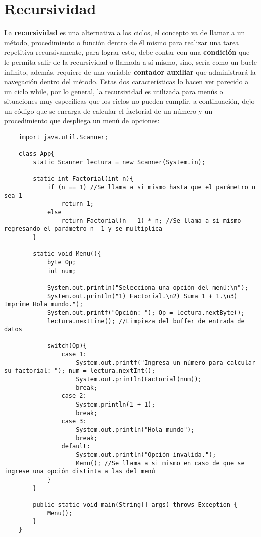 \section{Recursividad}
La \textbf{recursividad} es una alternativa a los ciclos, el concepto va de llamar a un método, procedimiento o función dentro de él mismo para realizar una tarea repetitiva recursivamente, para lograr esto, debe contar con una \textbf{condición} que le permita salir de la recursividad o llamada a sí mismo, sino, sería como un bucle infinito, además, requiere de una variable \textbf{contador auxiliar} que administrará la navegación dentro del método.
Estas dos características lo hacen ver parecido a un ciclo while, por lo general, la recursividad es utilizada para menús o situaciones muy específicas que los ciclos no pueden cumplir, a continuación, dejo un código que se encarga de calcular el factorial de un número y un procedimiento que despliega un menú de opciones:
\begin{lstlisting}
	import java.util.Scanner;

	class App{
		static Scanner lectura = new Scanner(System.in);	
	
		static int Factorial(int n){
			if (n == 1) //Se llama a si mismo hasta que el parámetro n sea 1
				return 1;
			else
				return Factorial(n - 1) * n; //Se llama a si mismo regresando el parámetro n -1 y se multiplica
		}
		
		static void Menu(){
			byte Op;
			int num;
			
			System.out.println("Selecciona una opción del menú:\n");
			System.out.println("1) Factorial.\n2) Suma 1 + 1.\n3) Imprime Hola mundo.");
			System.out.printf("Opción: "); Op = lectura.nextByte();
			lectura.nextLine(); //Limpieza del buffer de entrada de datos
			
			switch(Op){
				case 1:
					System.out.printf("Ingresa un número para calcular su factorial: "); num = lectura.nextInt();
					System.out.println(Factorial(num));
					break;
				case 2:
					System.println(1 + 1);
					break;
				case 3:
					System.out.println("Hola mundo");
					break;
				default:
					System.out.println("Opción invalida.");
					Menu(); //Se llama a si mismo en caso de que se ingrese una opción distinta a las del menú
			}
		}
	
		public static void main(String[] args) throws Exception {
			Menu();
		}
	}
\end{lstlisting}



